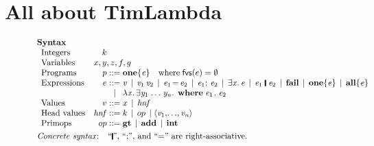\documentclass[acmsmall,review,dvipsnames]{acmart}
\newcommand{\Varid}[1]{\mathit{#1}}
\newif\iffullverse
\newcommand{\vb}{\; \ensuremath{\mathop{\mid}} \;}    %
\newcommand{\freevars}[1]{\mathsf{fvs}(#1)}
\newcommand{\hnf}{\mathit{hnf}}  %
\begin{document}
\section{All about TimLambda}


\begin{figure}
  $$
  \begin{array}{l}
    \textbf{Syntax} \\
    \begin{array}{lr@{\;}c@{\;}l}
    \text{Integers} & k \\
    \text{Variables} & \multicolumn{3}{l}{x,y,z,f,g} \\
    \text{Programs} & p  & ::=  & \ensuremath{\textbf{one}\{\Varid{e}\}} \quad \text{where} \; \freevars{e} = \emptyset \\
    \text{Expressions} & e  & ::=  & \ensuremath{\Varid{v}} \vb \ensuremath{\Varid{v}_{\mathrm{1}}\,\Varid{v}_{\mathrm{2}}}
       \vb \ensuremath{\Varid{e}_{\mathrm{1}}\hspace{-0.14em}=\hspace{-0.14em}\Varid{e}_{\mathrm{2}}} \vb \ensuremath{\Varid{e}_{\mathrm{1}};\,\Varid{e}_{\mathrm{2}}} \vb  \ensuremath{\exists\Varid{x}.\,\Varid{e}}
       \vb  \ensuremath{\Varid{e}_{\mathrm{1}}\;\rule[-0.1em]{0.15em}{0.75em}\;\Varid{e}_{\mathrm{2}}} \vb \ensuremath{\textbf{fail}} \vb \ensuremath{\textbf{one}\{\Varid{e}\}} \vb \ensuremath{\textbf{all}\{\Varid{e}\}} \\
       & & \vb & \ensuremath{\lambda\Varid{x}.\,\exists\Varid{y}_{\mathrm{1}}\;\!\ldots\!\;\Varid{y}_{\Varid{n}}.\,\;\mathbf{where}\;\Varid{e}_{\mathrm{1}}\;\! .\;\Varid{e}_{\mathrm{2}}} \\
\iffullverse
    && \vb & \ensuremath{\textbf{succeeds}\;\Varid{e}} \vb \ensuremath{\textbf{decides}\;\Varid{e}} \\
\fi
    \text{Values} & v & ::= & x  \vb \hnf \\
    \text{Head values} & \hnf & ::= & k \vb op \vb \ensuremath{\langle\Varid{v}_{\mathrm{1}},\!\ldots\!,\Varid{v}_{\Varid{n}}\rangle} \\
    \text{Primops} & op  & ::= & \ensuremath{\textbf{gt}} \vb \ensuremath{\textbf{add}} \vb \ensuremath{\textbf{int}}
    \end{array} \\
    \\[-3mm]
    \text{\emph{Concrete syntax}:} \;\;
    \begin{array}[t]{l}
          \text{``\ensuremath{\rule[-0.1em]{0.15em}{0.75em}}'', ``;'', and ``\ensuremath{\mathrel{=}}'' are right-associative.} \\

\end{array}
\end{array}$$
\end{figure}
\end{document}
